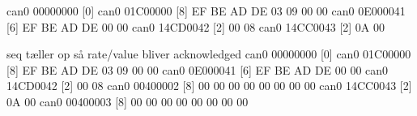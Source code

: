 \newpage


  can0  00000000   [0] 
  can0  01C00000   [8]  EF BE AD DE 03 09 00 00
  can0  0E000041   [6]  EF BE AD DE 00 00
  can0  14CD0042   [2]  00 08
  can0  14CC0043   [2]  0A 00



seq tæller op så rate/value bliver acknowledged
  can0  00000000   [0] 
  can0  01C00000   [8]  EF BE AD DE 03 09 00 00
  can0  0E000041   [6]  EF BE AD DE 00 00
  can0  14CD0042   [2]  00 08
  can0  00400002   [8]  00 00 00 00 00 00 00 00
  can0  14CC0043   [2]  0A 00
  can0  00400003   [8]  00 00 00 00 00 00 00 00


\newpage